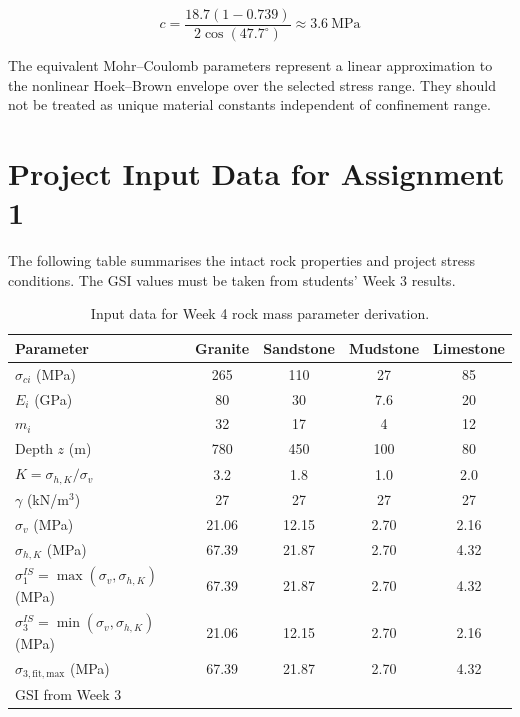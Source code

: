 \documentclass[a4paper,12pt]{article}
\begin{document}
\[
c=
\frac{18.7(1-0.739)}
{2\cos(47.7^\circ)}
\approx
3.6~\text{MPa}
\]

\begin{keybox}[Interpretation]
The equivalent Mohr--Coulomb parameters represent a linear approximation to the nonlinear
Hoek--Brown envelope over the selected stress range. They should not be treated as
unique material constants independent of confinement range.
\end{keybox}

\section{Project Input Data for Assignment 1}

The following table summarises the intact rock properties and project stress conditions.
The GSI values must be taken from students' Week 3 results.

\begin{table}[H]
\centering
\scriptsize
\begin{tabularx}{\textwidth}{l c c c c}
\toprule
\textbf{Parameter} & \textbf{Granite} & \textbf{Sandstone} & \textbf{Mudstone} & \textbf{Limestone} \\
\midrule
\(\sigma_{ci}\) (MPa) & 265 & 110 & 27 & 85 \\
\(E_i\) (GPa) & 80 & 30 & 7.6 & 20 \\
\(m_i\) & 32 & 17 & 4 & 12 \\
Depth \(z\) (m) & 780 & 450 & 100 & 80 \\
\(K=\sigma_{h,K}/\sigma_v\) & 3.2 & 1.8 & 1.0 & 2.0 \\
\(\gamma\) (kN/m\(^3\)) & 27 & 27 & 27 & 27 \\
\midrule
\(\sigma_v\) (MPa) & 21.06 & 12.15 & 2.70 & 2.16 \\
\(\sigma_{h,K}\) (MPa) & 67.39 & 21.87 & 2.70 & 4.32 \\
\(\sigma_1^{IS}=\max(\sigma_v,\sigma_{h,K})\) (MPa) & 67.39 & 21.87 & 2.70 & 4.32 \\
\(\sigma_3^{IS}=\min(\sigma_v,\sigma_{h,K})\) (MPa) & 21.06 & 12.15 & 2.70 & 2.16 \\
\(\sigma_{3,\mathrm{fit,max}}\) (MPa) & 67.39 & 21.87 & 2.70 & 4.32 \\
\midrule
GSI from Week 3 & \underline{\hspace{1.5cm}} & \underline{\hspace{1.5cm}} & \underline{\hspace{1.5cm}} & \underline{\hspace{1.5cm}} \\
\bottomrule
\end{tabularx}
\caption{Input data for Week 4 rock mass parameter derivation.}
\label{tab:inputdata}
\end{table}
\end{document}
